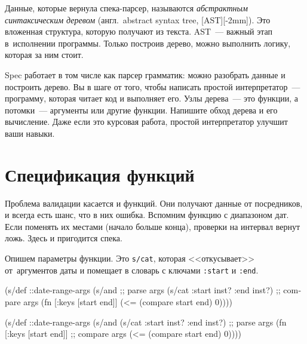 Данные, которые вернула спека-парсер, называются \emph{абстрактным синтаксическим деревом}
(англ.~abstract syntax tree, [AST][-2mm]).
Это вложенная структура, которую получают из текста. AST~--- важный этап в~исполнении
программы. Только построив дерево, можно выполнить логику, которая за ним стоит.


Spec работает в том числе как парсер грамматик: можно разобрать данные и
построить дерево. Вы в шаге от того, чтобы написать простой интерпретатор~---
программу, которая читает код и выполняет его. Узлы дерева~--- это функции, а
потомки~--- аргументы или другие функции. Напишите обход дерева и его
вычисление. Даже если это курсовая работа, простой интерпретатор улучшит ваши
навыки.

\section{Спецификация функций}


Проблема валидации касается и функций. Они получают данные от посредников, и
всегда есть шанс, что в них ошибка. Вспомним функцию с диапазоном дат. Если
поменять их местами (начало больше конца), проверки на интервал вернут
ложь. Здесь и пригодится спека.

Опишем параметры функции. Это \verb|s/cat|, которая <<откусывает>>
от~аргументов даты и помещает в словарь с ключами \verb|:start| и
\verb|:end|.

\ifx\DEVICETYPE\MOBILE

\begin{english}
  \begin{clojure}
(s/def ::date-range-args
  (s/and
    ;; parse args
    (s/cat :start inst? :end inst?)
    ;; compare args
    (fn [{:keys [start end]}]
      (<= (compare start end) 0))))
  \end{clojure}
\end{english}

\else

\begin{english}
  \begin{clojure}
(s/def ::date-range-args
  (s/and
   (s/cat :start inst? :end inst?) ;; parse args
   (fn [{:keys [start end]}]       ;; compare args
     (<= (compare start end) 0))))
  \end{clojure}
\end{english}

